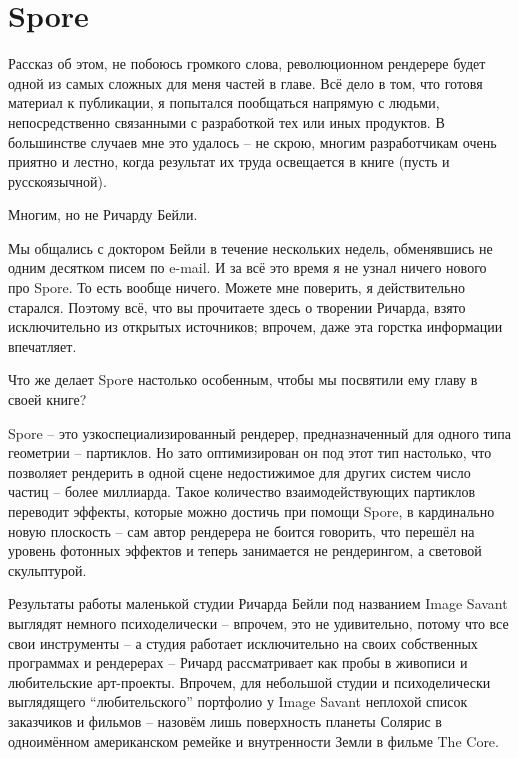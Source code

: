 \chapter*{Spore}
  

 Рассказ об этом, не побоюсь громкого слова,
    революционном рендерере будет одной из самых сложных для меня
    частей в главе. Всё дело в том, что готовя материал к публикации, я
    попытался пообщаться напрямую с людьми, непосредственно связанными
    с разработкой тех или иных продуктов. В большинстве случаев мне это
    удалось – не скрою, многим разработчикам очень приятно и лестно,
    когда результат их труда освещается в книге (пусть и
    русскоязычной).
  

 Многим, но не Ричарду Бейли.
  

 Мы общались с доктором Бейли в течение нескольких
    недель, обменявшись не одним десятком писем по e-mail. И за всё это
    время я не узнал ничего нового про Spore. То есть вообще ничего.
    Можете мне поверить, я действительно старался. Поэтому всё, что вы
    прочитаете здесь о творении Ричарда, взято исключительно из
    открытых источников; впрочем, даже эта горстка информации
    впечатляет.
  

 Что же делает Sporе настолько особенным, чтобы мы
    посвятили ему главу в своей книге?
  

 Spore – это узкоспециализированный рендерер,
    предназначенный для одного типа геометрии – партиклов. Но зато
    оптимизирован он под этот тип настолько, что позволяет рендерить в
    одной сцене недостижимое для других систем число частиц – более
    миллиарда. Такое количество взаимодействующих партиклов переводит
    эффекты, которые можно достичь при помощи Spore, в кардинально
    новую плоскость – сам автор рендерера не боится говорить, что
    перешёл на уровень фотонных эффектов и теперь занимается не
    рендерингом, а световой скульптурой.
  

 Результаты работы маленькой студии Ричарда Бейли
    под названием Image Savant выглядят немного психоделически –
    впрочем, это не удивительно, потому что все свои инструменты – а
    студия работает исключительно на своих собственных программах и
    рендерерах – Ричард рассматривает как пробы в живописи и
    любительские арт-проекты. Впрочем, для небольшой студии и
    психоделически выглядящего “любительского” портфолио у Image Savant
    неплохой список заказчиков и фильмов – назовём лишь поверхность
    планеты Солярис в одноимённом американском ремейке и внутренности
    Земли в фильме The Core.
  

